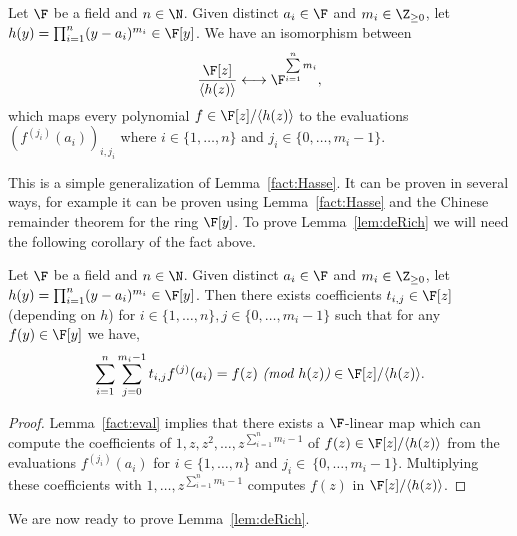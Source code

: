 \begin{lem}\label{fact:eval}
Let $\F$ be a field and $n\in \N$. Given distinct $a_i\in \F$ and $m_i\in \Z_{\ge 0}$, let $h(y)=\prod_{i=1}^n (y-a_i)^{m_i}\in \F[y]$. We have an isomorphism between
$$\frac{\F[z]}{\left\langle h(z)\right\rangle } \longleftrightarrow \F^{\sum\limits_{i=1}^n m_i},$$
which maps every polynomial $f\in \F[z]/\langle h(z)\rangle$ to the evaluations $(f^{(j_i)}(a_i))_{i,j_i}$ where $i\in \{1,\hdots,n\}$ and $j_i\in \{0,\hdots,m_i-1\}$. 
\end{lem}

This is a simple generalization of Lemma~\ref{fact:Hasse}. It can be proven in several ways, for example it can be proven using Lemma~\ref{fact:Hasse} and the Chinese remainder theorem for the ring $\F[y]$. To prove Lemma~\ref{lem:deRich} we will need the following corollary of the fact above.

\begin{cor}\label{cor:eval}
Let $\F$ be a field and $n\in \N$. Given distinct $a_i\in \F$ and $m_i\in \Z_{\ge 0}$, let $h(y)=\prod_{i=1}^n (y-a_i)^{m_i}\in \F[y]$. Then there exists coefficients $t_{i,j}\in \F[z]$ (depending on $h$) for $i\in \{1,\hdots,n\},j\in \{0,\hdots,m_i-1\}$ such that for any $f(y)\in \F[y]$ we have,
$$\sum\limits_{i=1}^n \sum\limits_{j=0}^{m_i-1} t_{i,j} f^{(j)}(a_i)=f(z)  \text{ {\em (mod }} h(z)\text{{\em )}} \in  \F[z]/\langle h(z)\rangle.$$
\end{cor}
\begin{proof}
Lemma~\ref{fact:eval} implies that there exists a $\F$-linear map which can compute the coefficients of $1,z,z^2,\hdots, z^{\sum_{i=1}^n m_i-1}$ of $f(z) \in \F[z]/\langle h(z)\rangle$ from the evaluations $f^{(j_i)}(a_i)$ for $i\in \{1,\hdots,n\}$ and $j_i\in~\{0,\hdots,m_i-1\}$. Multiplying these coefficients with $1,\hdots, z^{\sum_{i=1}^n m_i-1}$ computes $f(z)$ in $\F[z]/\langle h(z)\rangle$.
\end{proof}

We are now ready to prove Lemma~\ref{lem:deRich}.

